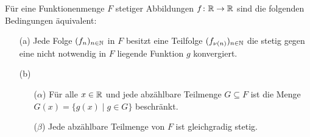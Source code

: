 \begin{thm}
  Für eine Funktionenmenge $F$ stetiger Abbildungen $f \colon \mathbb{R} \to \mathbb{R}$ sind die folgenden Bedingungen äquivalent:
  \begin{itemize}
    \item[(a)] Jede Folge $(f_n)_{n \in \mathbb{N}}$ in $F$ besitzt eine Teilfolge $(f_{\nu(n)})_{n \in \mathbb{N}}$ die stetig gegen eine nicht notwendig in $F$ liegende Funktion $g$ konvergiert.

    \item[(b)]
      \begin{itemize}
        \item[($\alpha$)] Für alle $x \in \mathbb{R}$ und jede abzählbare Teilmenge $G \subseteq F$ ist die Menge $G(x) = \{ g(x) \mid g \in G \}$ beschränkt.
        \item[($\beta$)] Jede abzählbare Teilmenge von $F$ ist gleichgradig stetig.
      \end{itemize}
  \end{itemize}
\end{thm}

